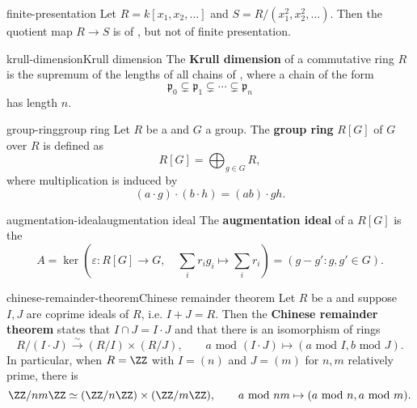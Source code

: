 \begin{example}{finite-presentation}
    Let $R = k[x_1, x_2, \ldots]$ and $S = R / (x_1^2, x_2^2, \ldots)$. Then the quotient map $R \to S$ is of , but not of finite presentation.
\end{example}

\begin{topic}{krull-dimension}{Krull dimension}
    The \textbf{Krull dimension} of a commutative ring $R$ is the supremum of the lengths of all chains of , where a chain of the form
    \[ \mathfrak{p}_0 \subsetneq \mathfrak{p}_1 \subsetneq \cdots \subsetneq \mathfrak{p}_n \]
    has length $n$.
\end{topic}

\begin{topic}{group-ring}{group ring}
    Let $R$ be a  and $G$ a group. The \textbf{group ring} $R[G]$ of $G$ over $R$ is defined as
    \[ R[G] = \bigoplus_{g \in G} R , \]
    where multiplication is induced by
    \[ (a \cdot g) \cdot (b \cdot h) = (ab) \cdot gh . \]
\end{topic}

\begin{topic}{augmentation-ideal}{augmentation ideal}
    The \textbf{augmentation ideal} of a  $R[G]$ is the 
    \[ A = \ker\left( \varepsilon : R[G] \to G, \quad \sum_i r_i g_i \mapsto \sum_i r_i  \right) = (g - g' : g, g' \in G). \]
\end{topic}

\begin{topic}{chinese-remainder-theorem}{Chinese remainder theorem}
    Let $R$ be a  and suppose $I, J$ are coprime ideals of $R$, i.e. $I + J = R$. Then the \textbf{Chinese remainder theorem} states that $I \cap J = I \cdot J$ and that there is an isomorphism of rings
    \[ R / (I \cdot J) \xrightarrow{\sim} (R / I) \times (R/J), \qquad a \text{ mod } (I \cdot J) \mapsto (a \text{ mod } I, b \text{ mod } J) . \]
    In particular, when $R = \ZZ$ with $I = (n)$ and $J = (m)$ for $n, m$ relatively prime, there is
    \[ \ZZ / nm \ZZ \simeq (\ZZ/n\ZZ) \times (\ZZ/m\ZZ), \qquad a \text{ mod } nm \mapsto (a \text{ mod } n, a \text{ mod } m) . \]
\end{topic}

